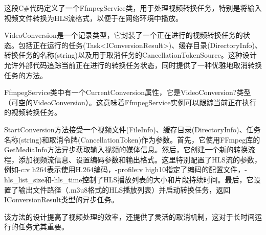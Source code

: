 \documentclass[main.tex]{subfiles}
\begin{document}
这段C\#代码定义了一个FfmpegService类，用于处理视频转换任务，特别是将输入视频文件转换为HLS流格式，以便于在网络环境中播放。

VideoConversion是一个记录类型，它封装了一个正在进行的视频转换任务的状态。包括正在运行的任务(Task<IConversionResult>)、缓存目录(DirectoryInfo)、转换任务的名称(string)以及用于取消任务的CancellationTokenSource。这种设计允许外部代码追踪当前正在进行的转换任务状态，同时提供了一种优雅地取消转换任务的方法。

FfmpegService类中有一个CurrentConversion属性，它是VideoConversion?类型（可空的VideoConversion）。这意味着FfmpegService实例可以跟踪当前正在执行的视频转换任务。

StartConversion方法接受一个视频文件(FileInfo)、缓存目录(DirectoryInfo)、任务名称(string)和取消令牌(CancellationToken)作为参数。首先，它使用FFmpeg库的GetMediaInfo方法异步获取输入视频的媒体信息。然后，它创建一个新的转换流程，添加视频流信息、设置编码参数和输出格式。这里特别配置了HLS流的参数，例如-c:v h264表示使用H.264编码，-profile:v high10指定了编码的配置文件，-hls\_list\_size和-hls\_time控制了HLS播放列表的大小和片段持续时间。最后，它设置了输出文件路径（.m3u8格式的HLS播放列表）并启动转换任务，返回IConversionResult类型的异步任务。

该方法的设计提高了视频处理的效率，还提供了灵活的取消机制，这对于长时间运行的任务尤其重要。
\end{document}

